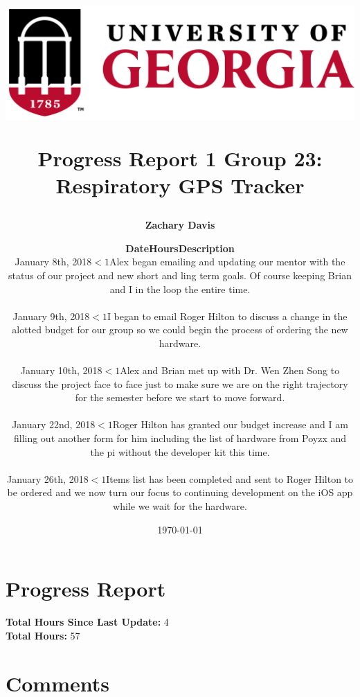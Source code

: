 \documentclass[11pt]{report}
\title{
	\begin{center}
		\includegraphics[scale=0.5]{uga.PNG}\\
 	\end{center}
 	Progress Report 1
\bigbreak Group 23: Respiratory GPS Tracker
}
\author{\textbf{Zachary Davis}}
\date{\today}
\begin{document}
\maketitle

\section*{Progress Report}
	\begin{center}
		\author{
		{\normalsize
		\begin{tabular}{m{4cm} m{2cm} m{10cm}}
		\textbf{Date} & \textbf{Hours} & \textbf{Description}\\
		\hline
		January 8th, 2018 & $<1$ & Alex began emailing and updating our mentor with the status of our project and new short and ling term goals.  Of course keeping Brian and I in the loop the entire time.\\
		&&\\
		January 9th, 2018 & $<1$ & I began to email Roger Hilton to discuss a change in the alotted budget for our group so we could begin the process of ordering the new hardware.\\
		&&\\
		January 10th, 2018 & $<1$ & Alex and Brian met up with Dr. Wen Zhen Song to discuss the project face to face just to make sure we are on the right trajectory for the semester before we start to move forward.\\
		&&\\
		January 22nd, 2018 & $<1$ & Roger Hilton has granted our budget increase and I am filling out another form for him including the list of hardware from Poyzx and the pi without the developer kit this time.\\
		&&\\
		January 26th, 2018 & $<1$ & Items list has been completed and sent to Roger Hilton to be ordered and we now turn our focus to continuing development on the iOS app while we wait for the hardware.\\
		\end{tabular}
		}
		}
	\end{center}
		\textbf{Total Hours Since Last Update: } 4\\
		\textbf{Total Hours: } 57

\newpage

\section*{Comments}
\end{document}
